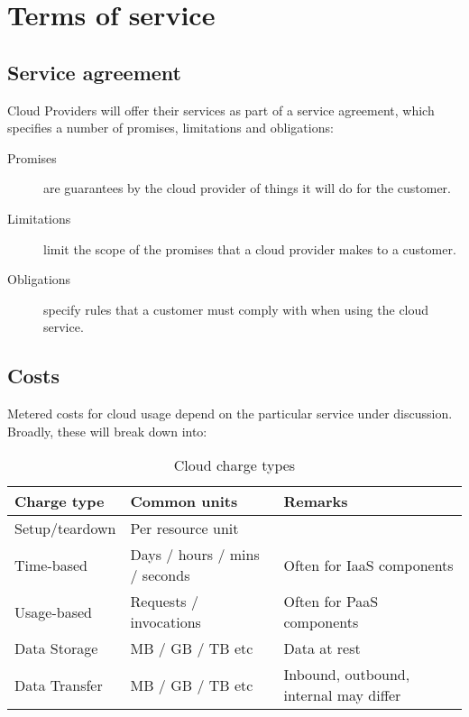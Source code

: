 \chapter{Terms of service}
\label{ch:terms-of-service}

\section{Service agreement}\label{service-agreement}

Cloud Providers will offer their services as part of a service
agreement, which specifies a number of promises, limitations and
obligations:

\begin{description}
\item[Promises]
are guarantees by the cloud provider of things it will do for the
customer.
\item[Limitations]
limit the scope of the promises that a cloud provider makes to a
customer.
\item[Obligations]
specify rules that a customer must comply with when using the cloud
service.
\end{description}

\section{Costs}
\label{sec:costs}

Metered costs for cloud usage depend on the particular service under
discussion. Broadly, these will break down into:

\begin{table}
  \begin{tabularx}{1.0\linewidth}{l l X}
    \toprule
    \textbf{Charge type} & \textbf{Common units} & \textbf{Remarks}\\
    \midrule
    Setup/teardown & Per resource unit & ~ \\
    Time-based & Days / hours / mins / seconds & Often for IaaS components\\
    Usage-based & Requests / invocations & Often for PaaS components\\
    Data Storage & MB / GB / TB etc & Data at rest\\
    Data Transfer & MB / GB / TB etc & Inbound, outbound, internal may differ\\
    \bottomrule
  \end{tabularx}
  \caption{Cloud charge types}
  \label{tab:cloud-charge-types}
\end{table}

